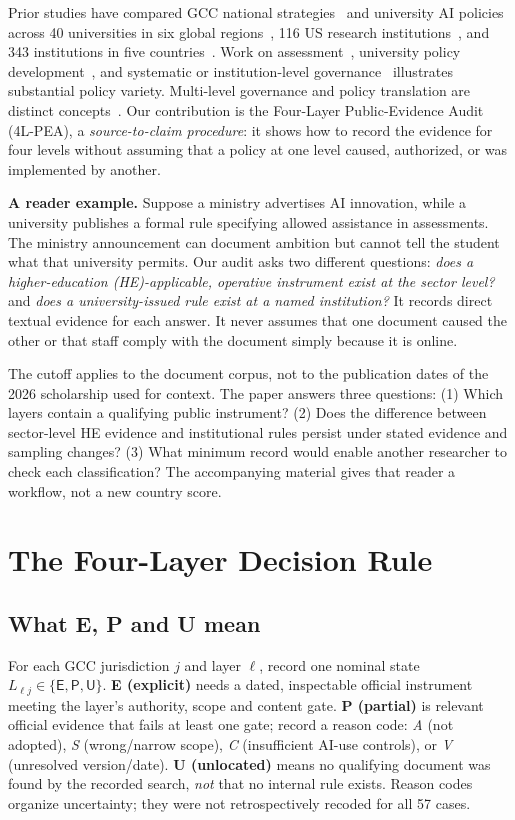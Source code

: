 \documentclass[conference,letterpaper]{IEEEtran}
\newcommand{\stE}{\textsf{E}}
\newcommand{\stP}{\textsf{P}}
\newcommand{\stU}{\textsf{U}}
\begin{document}
Prior studies have compared GCC national strategies~\cite{albous} and university AI policies across 40 universities in six global regions~\cite{jin}, 116 US research institutions~\cite{mcdonald}, and 343 institutions in five countries~\cite{parker}. Work on assessment~\cite{moorhouse}, university policy development~\cite{li}, and systematic or institution-level governance~\cite{jiang,khoza,an,bacalso,qian} illustrates substantial policy variety. Multi-level governance and policy translation are distinct concepts~\cite{vukasovic,donina}. Our contribution is the Four-Layer Public-Evidence Audit (4L-PEA), a \emph{source-to-claim procedure}: it shows how to record the evidence for four levels without assuming that a policy at one level caused, authorized, or was implemented by another.

\textbf{A reader example.} Suppose a ministry advertises AI innovation, while a university publishes a formal rule specifying allowed assistance in assessments. The ministry announcement can document ambition but cannot tell the student what that university permits. Our audit asks two different questions: \emph{does a higher-education (HE)-applicable, operative instrument exist at the sector level?} and \emph{does a university-issued rule exist at a named institution?} It records direct textual evidence for each answer. It never assumes that one document caused the other or that staff comply with the document simply because it is online.

The cutoff applies to the document corpus, not to the publication dates of the 2026 scholarship used for context. The paper answers three questions: (1) Which layers contain a qualifying public instrument? (2) Does the difference between sector-level HE evidence and institutional rules persist under stated evidence and sampling changes? (3) What minimum record would enable another researcher to check each classification? The accompanying material gives that reader a workflow, not a new country score.

\section{The Four-Layer Decision Rule}
\subsection{What E, P and U mean}
For each GCC jurisdiction $j$ and layer $\ell$, record one nominal state $L_{\ell j}\in\{\stE,\stP,\stU\}$. \textbf{E (explicit)} needs a dated, inspectable official instrument meeting the layer's authority, scope and content gate. \textbf{P (partial)} is relevant official evidence that fails at least one gate; record a reason code: \emph{A} (not adopted), \emph{S} (wrong/narrow scope), \emph{C} (insufficient AI-use controls), or \emph{V} (unresolved version/date). \textbf{U (unlocated)} means no qualifying document was found by the recorded search, \emph{not} that no internal rule exists. Reason codes organize uncertainty; they were not retrospectively recoded for all 57 cases.
\end{document}

